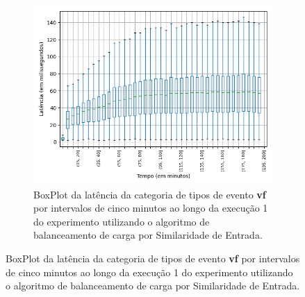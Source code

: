 

\begin{figure}
\centering
\begin{subfigure}{.5\textwidth}
\centering
\includegraphics[width=\textwidth]{figuras/graphics/boxplot_6-dez-is_vf.png}
\caption{BoxPlot da latência da categoria de tipos de evento \textbf{vf} por intervalos de cinco minutos ao longo da execução 1 do experimento utilizando o algoritmo de balanceamento de carga por Similaridade de Entrada.}
\label{fig:BoxPlot_vf_IS_1}
\end{subfigure}%


\end{figure}
